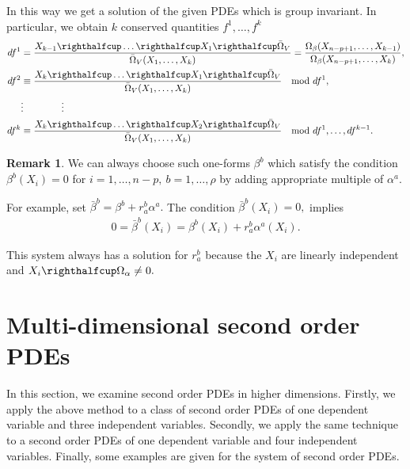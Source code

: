 \documentclass[a4paper, 11pt]{amsart}
\theoremstyle{definition}
\newtheorem{remark}[theorem]{Remark}
\begin{document}
In this way we get a solution of the given PDEs which is group invariant. In particular, we obtain $k$ conserved quantities $f^1,\dots,f^k$
\begin{align*}
df^1&=\frac{X_{k-1}\righthalfcup\dots\righthalfcup X_1\righthalfcup \bar{\Omega}_V}{\bar{\Omega}_V(X_1,\dots,X_k)}=\frac{\Omega_\beta(X_{n-p+1},\ldots,X_{k-1})}{\Omega_\beta(X_{n-p+1},\dots,X_k)},\\
df^2&\equiv\frac{X_{k}\righthalfcup\dots\righthalfcup X_1\righthalfcup \bar{\Omega}_V}{\bar{\Omega}_V(X_1,\dots,X_k)}\quad \text{mod}\ df^1,\\
&\vdots\qquad\qquad\vdots\\
df^k&\equiv\frac{X_{k}\righthalfcup\dots\righthalfcup X_2\righthalfcup \bar{\Omega}_V}{\bar{\Omega}_V(X_1,\dots,X_k)} \quad \text{mod}\ df^1,\dots,df^{k-1}.
\end{align*}
\begin{remark}\label{remark:extra 1-forms}
  We can always choose such one-forms $\beta^b$ which satisfy the condition $\beta^b(X_i)=0$ for $i=1,\ldots,n-p,~b=1,\ldots,\rho$ by adding appropriate multiple of $\alpha^a.$

  For example, set $\bar{\beta}^b=\beta^b+r^b_a\alpha^a.$ The condition $\bar{\beta}^b(X_i)=0,$ implies
  \begin{align*}
    0=\bar{\beta}^b(X_i)=\beta^b(X_i)+r^b_a\alpha^a(X_i).
  \end{align*}

  This system always has a solution for $r^b_a$ because the $X_i$ are linearly independent and $X_i\righthalfcup\Omega_\alpha\neq 0.$
\end{remark}
\section{Multi-dimensional second order PDEs}
\noindent In this section, we examine second order PDEs in higher dimensions. Firstly, we apply the above method to a class of second order PDEs of one dependent variable and three independent variables. Secondly, we apply the same technique to a second order PDEs of one dependent variable and four independent variables. Finally, some examples are given for the system of second order PDEs.
\end{document}
